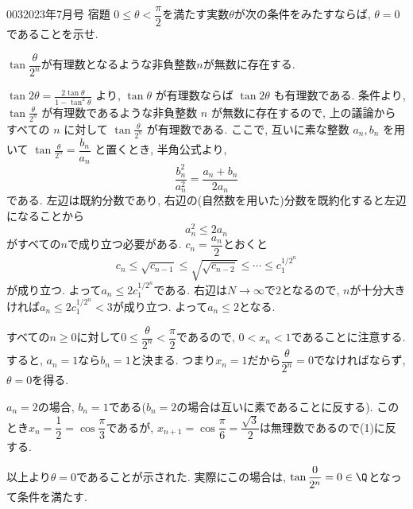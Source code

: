 \begin{prob}{003}{}{2023年7月号 宿題}
 $0 \leq \theta < \dfrac{\pi}{2}$を満たす実数$\theta$が次の条件をみたすならば, $\theta=0$であることを示せ.
 \begin{center}
 $\tan{\dfrac{\theta}{2^n}}$が有理数となるような非負整数$n$が無数に存在する.
 \end{center}
\end{prob}

$\tan{2\theta} = \frac{2\tan{\theta}}{1-\tan^2{\theta}}$ より, $\tan{\theta}$ が有理数ならば $\tan{2\theta}$ も有理数である.
条件より, $\tan{\frac{\theta}{2^n}}$ が有理数であるような非負整数 $n$ が無数に存在するので, 上の議論からすべての $n$ に対して $\tan{\frac{\theta}{2^n}}$ が有理数である.
ここで, 互いに素な整数 $a_n, b_n$ を用いて $\tan{\frac{\theta}{2^n}} = \dfrac{b_n}{a_n}$ と置くとき,
半角公式より,
\[
\dfrac{b_n^2}{a_n^2} = \dfrac{a_n + b_n}{2a_n}
\]
である. 左辺は既約分数であり, 右辺の(自然数を用いた)分数を既約化すると左辺になることから
\[
a_n^2 \leq 2a_n
\]
がすべての$n$で成り立つ必要がある. $c_n = \dfrac{a_n}{2}$とおくと
\[
c_n \leq \sqrt{c_{n-1}} \leq \sqrt{\sqrt{c_{n-2}}} \leq \cdots \leq c_1^{1/2^n}
\]
が成り立つ. よって$a_n \leq 2c_1^{1/2^{n}}$である. 右辺は$N\to\infty$で$2$となるので,  $n$が十分大きければ$a_n \leq 2c_1^{1/2^n} < 3$が成り立つ. よって$a_n \leq 2$となる. \par
すべての$n\geq 0$に対して$0\leq \dfrac{\theta}{2^n} < \dfrac{\pi}{2}$であるので, $0<x_n<1$であることに注意する. すると, $a_n = 1$なら$b_n = 1$と決まる. つまり$x_n = 1$だから$\dfrac{\theta}{2^n} = 0$でなければならず, $\theta=0$を得る. \par
$a_n = 2$の場合, $b_n = 1$である($b_n = 2$の場合は互いに素であることに反する). このとき$x_n = \dfrac{1}{2} = \cos{\dfrac{\pi}{3}}$であるが, $x_{n+1} = \cos{\dfrac{\pi}{6}} = \dfrac{\sqrt{3}}{2}$は無理数であるので(1)に反する. \par
以上より$\theta=0$であることが示された. 実際にこの場合は, $\tan{\dfrac{0}{2^n}} = 0\in \Q$となって条件を満たす.
